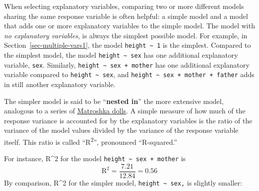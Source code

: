 \documentclass[
  letterpaper,
  DIV=11,
  numbers=noendperiod,
  oneside]{scrartcl}
\begin{document}
When selecting explanatory variables, comparing two or more different
models sharing the same response variable is often helpful: a simple
model and a model that adds one or more explanatory variables to the
simple model. The model with \emph{no explanatory variables}, is always
the simplest possible model. For example, in
Section~\ref{sec-multiple-vars1}, the model
\texttt{height\ \textasciitilde{}\ 1} is the simplest. Compared to the
simplest model, the model \texttt{height\ \textasciitilde{}\ sex} has
one additional explanatory variable, \texttt{sex}. Similarly,
\texttt{height\ \textasciitilde{}\ sex\ +\ mother} has one additional
explanatory variable compared to
\texttt{height\ \textasciitilde{}\ sex}, and
\texttt{height\ \textasciitilde{}\ sex\ +\ mother\ +\ father} adds in
still another explanatory variable.

The simpler model is said to be ``\textbf{nested in}'' the more
extensive model, analogous to a series of
\href{https://en.wikipedia.org/wiki/Matryoshka_doll}{Matroshka dolls}. A
simple measure of how much of the response variance is accounted for by
the explanatory variables is the ratio of the variance of the model
values divided by the variance of the response variable itself. This
ratio is called ``R\textsuperscript{2}'', pronounced ``R-squared.''


For instance, R\^{}2 for the model
\texttt{height\ \textasciitilde{}\ sex\ +\ mother} is
\[\text{R}^2 = \frac{7.21}{12.84} = 0.56\]
{} By comparison, R\^{}2 for the
simpler model, \texttt{height\ \textasciitilde{}\ sex,} is slightly
smaller:
\end{document}
